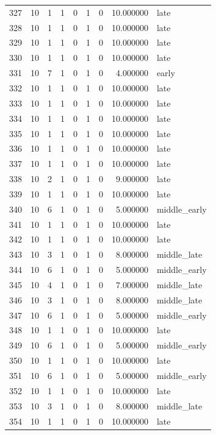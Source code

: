 \begin{longtable}{rrrrrrrrl}
327 & 10 & 1 & 1 & 0 & 1 & 0 & 10.000000 & late \\
328 & 10 & 1 & 1 & 0 & 1 & 0 & 10.000000 & late \\
329 & 10 & 1 & 1 & 0 & 1 & 0 & 10.000000 & late \\
330 & 10 & 1 & 1 & 0 & 1 & 0 & 10.000000 & late \\
331 & 10 & 7 & 1 & 0 & 1 & 0 & 4.000000 & early \\
332 & 10 & 1 & 1 & 0 & 1 & 0 & 10.000000 & late \\
333 & 10 & 1 & 1 & 0 & 1 & 0 & 10.000000 & late \\
334 & 10 & 1 & 1 & 0 & 1 & 0 & 10.000000 & late \\
335 & 10 & 1 & 1 & 0 & 1 & 0 & 10.000000 & late \\
336 & 10 & 1 & 1 & 0 & 1 & 0 & 10.000000 & late \\
337 & 10 & 1 & 1 & 0 & 1 & 0 & 10.000000 & late \\
338 & 10 & 2 & 1 & 0 & 1 & 0 & 9.000000 & late \\
339 & 10 & 1 & 1 & 0 & 1 & 0 & 10.000000 & late \\
340 & 10 & 6 & 1 & 0 & 1 & 0 & 5.000000 & middle\_early \\
341 & 10 & 1 & 1 & 0 & 1 & 0 & 10.000000 & late \\
342 & 10 & 1 & 1 & 0 & 1 & 0 & 10.000000 & late \\
343 & 10 & 3 & 1 & 0 & 1 & 0 & 8.000000 & middle\_late \\
344 & 10 & 6 & 1 & 0 & 1 & 0 & 5.000000 & middle\_early \\
345 & 10 & 4 & 1 & 0 & 1 & 0 & 7.000000 & middle\_late \\
346 & 10 & 3 & 1 & 0 & 1 & 0 & 8.000000 & middle\_late \\
347 & 10 & 6 & 1 & 0 & 1 & 0 & 5.000000 & middle\_early \\
348 & 10 & 1 & 1 & 0 & 1 & 0 & 10.000000 & late \\
349 & 10 & 6 & 1 & 0 & 1 & 0 & 5.000000 & middle\_early \\
350 & 10 & 1 & 1 & 0 & 1 & 0 & 10.000000 & late \\
351 & 10 & 6 & 1 & 0 & 1 & 0 & 5.000000 & middle\_early \\
352 & 10 & 1 & 1 & 0 & 1 & 0 & 10.000000 & late \\
353 & 10 & 3 & 1 & 0 & 1 & 0 & 8.000000 & middle\_late \\
354 & 10 & 1 & 1 & 0 & 1 & 0 & 10.000000 & late \\

\end{longtable}
